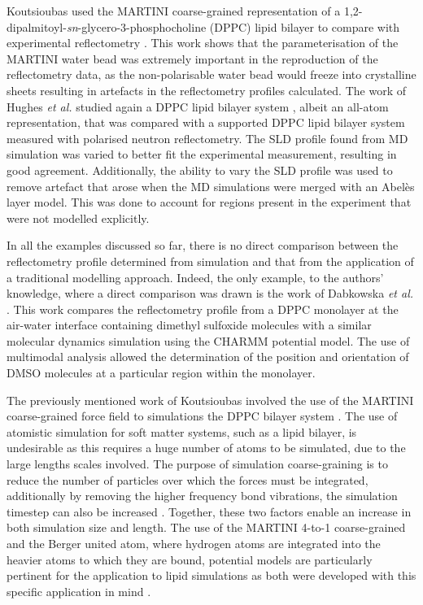 Koutsioubas used the MARTINI coarse-grained representation of a 1,2-dipalmitoyl-\emph{sn}-glycero-3-phosphocholine (DPPC) lipid bilayer to compare with experimental reflectometry \cite{koutsioubas_combined_2016}.
This work shows that the parameterisation of the MARTINI water bead was extremely important in the reproduction of the reflectometry data, as the non-polarisable water bead would freeze into crystalline sheets resulting in artefacts in the reflectometry profiles calculated.
The work of Hughes \emph{et al.} studied again a DPPC lipid bilayer system \cite{hughes_interpretation_2016}, albeit an all-atom representation, that was compared with a supported DPPC lipid bilayer system measured with polarised neutron reflectometry.
The SLD profile found from MD simulation was varied to better fit the experimental measurement, resulting in good agreement.
Additionally, the ability to vary the SLD profile was used to remove artefact that arose when the MD simulations were merged with an Abel\`{e}s layer model.
This was done to account for regions present in the experiment that were not modelled explicitly.

In all the examples discussed so far, there is no direct comparison between the reflectometry profile determined from simulation and that from the application of a traditional modelling approach.
Indeed, the only example, to the authors' knowledge, where a direct comparison was drawn is the work of Dabkowska \emph{et al.} \cite{dabkowska_modulation_2014}.
This work compares the reflectometry profile from a DPPC monolayer at the air-water interface containing dimethyl sulfoxide molecules with a similar molecular dynamics simulation using the CHARMM potential model.
The use of multimodal analysis allowed the determination of the position and orientation of DMSO molecules at a particular region within the monolayer.

The previously mentioned work of Koutsioubas involved the use of the MARTINI coarse-grained force field to simulations the DPPC bilayer system \cite{koutsioubas_combined_2016}.
The use of atomistic simulation for soft matter systems, such as a lipid bilayer, is undesirable as this requires a huge number of atoms to be simulated, due to the large lengths scales involved.
The purpose of simulation coarse-graining is to reduce the number of particles over which the forces must be integrated, additionally by removing the higher frequency bond vibrations, the simulation timestep can also be increased \cite{pluhackova_biomembranes_2015}.
Together, these two factors enable an increase in both simulation size and length.
The use of the MARTINI 4-to-1 coarse-grained and the Berger united atom, where hydrogen atoms are integrated into the heavier atoms to which they are bound, potential models are particularly pertinent for the application to lipid simulations as both were developed with this specific application in mind \cite{marrink_martini_2007,berger_molecular_1997}.

